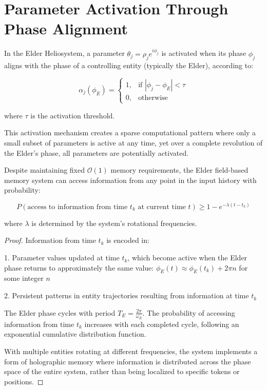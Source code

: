 \section{Parameter Activation Through Phase Alignment}

\begin{definition}
In the Elder Heliosystem, a parameter $\theta_j = \rho_j e^{i\phi_j}$ is activated when its phase $\phi_j$ aligns with the phase of a controlling entity (typically the Elder), according to:

\begin{equation}
\alpha_j(\phi_E) = 
\begin{cases}
1, & \text{if } |\phi_j - \phi_E| < \tau \\
0, & \text{otherwise}
\end{cases}
\end{equation}

where $\tau$ is the activation threshold.
\end{definition}

This activation mechanism creates a sparse computational pattern where only a small subset of parameters is active at any time, yet over a complete revolution of the Elder's phase, all parameters are potentially activated.

\begin{theorem}
Despite maintaining fixed $\mathcal{O}(1)$ memory requirements, the Elder field-based memory system can access information from any point in the input history with probability:

\begin{equation}
P(\text{access to information from time } t_k \text{ at current time } t) \geq 1 - e^{-\lambda (t-t_k)}
\end{equation}

where $\lambda$ is determined by the system's rotational frequencies.
\end{theorem}

\begin{proof}
Information from time $t_k$ is encoded in:

1. Parameter values updated at time $t_k$, which become active when the Elder phase returns to approximately the same value: $\phi_E(t) \approx \phi_E(t_k) + 2\pi n$ for some integer $n$

2. Persistent patterns in entity trajectories resulting from information at time $t_k$

The Elder phase cycles with period $T_E = \frac{2\pi}{\omega_E}$. The probability of accessing information from time $t_k$ increases with each completed cycle, following an exponential cumulative distribution function.

With multiple entities rotating at different frequencies, the system implements a form of holographic memory where information is distributed across the phase space of the entire system, rather than being localized to specific tokens or positions.
\end{proof}

